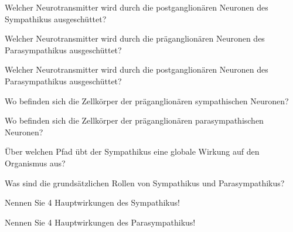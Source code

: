 \documentclass[10pt, a4paper]{exam}
\begin{document}
\begin{questions}
\begin{solution}
  \end{solution}

  \question Welcher Neurotransmitter wird durch die postganglionären Neuronen des Sympathikus ausgeschüttet?
  \begin{solution}

  \end{solution}

  \question Welcher Neurotransmitter wird durch die präganglionären Neuronen des Parasympathikus ausgeschüttet?
  \begin{solution}

  \end{solution}

  \question Welcher Neurotransmitter wird durch die postganglionären Neuronen des Parasympathikus ausgeschüttet?
  \begin{solution}

  \end{solution}

  \question Wo befinden sich die Zellkörper der präganglionären sympathischen Neuronen?
  \begin{solution}

  \end{solution}

  \question Wo befinden sich die Zellkörper der präganglionären parasympathischen Neuronen?
  \begin{solution}

  \end{solution}

  \question Über welchen Pfad übt der Sympathikus eine globale Wirkung auf den Organismus aus?
  \begin{solution}

  \end{solution}

  \question Was sind die grundsätzlichen Rollen von Sympathikus und Parasympathikus?
  \begin{solution}

  \end{solution}

  \question Nennen Sie 4 Hauptwirkungen des Sympathikus!
  \begin{solution}

  \end{solution}

  \question Nennen Sie 4 Hauptwirkungen des Parasympathikus!
  \begin{solution}

  \end{solution}


\end{questions}
\end{document}
